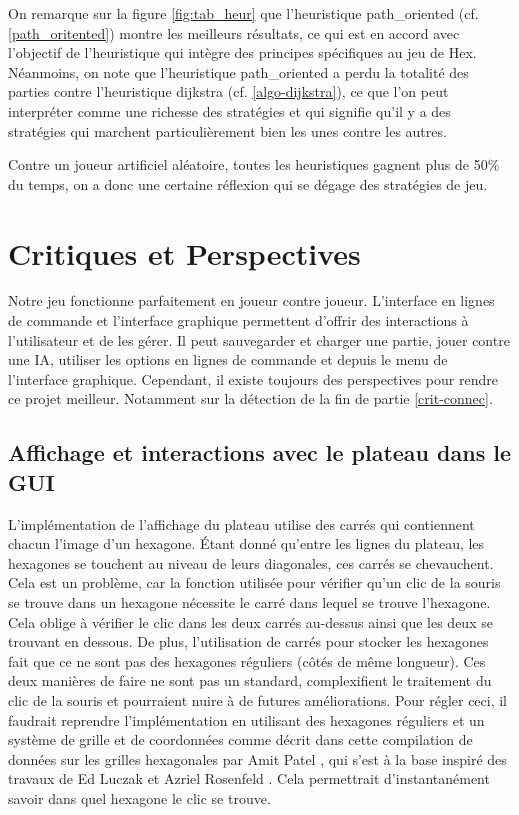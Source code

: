 \documentclass[12pt]{article}
\begin{document}
On remarque sur la figure \ref{fig:tab_heur} que l’heuristique path\_oriented (cf. \ref{path_oritented}) montre les meilleurs résultats, ce qui est en accord avec l’objectif de l’heuristique qui intègre des principes spécifiques au jeu de Hex. Néanmoins, on note que l’heuristique path\_oriented a perdu la totalité des parties contre l’heuristique dijkstra (cf. \ref{algo-dijkstra}), ce que l’on peut interpréter comme une richesse des stratégies et qui signifie qu’il y a des stratégies qui marchent particulièrement bien les unes contre les autres.

\bigskip
Contre un joueur artificiel aléatoire, toutes les heuristiques gagnent plus de 50\% du temps, on a donc une certaine réflexion qui se dégage des stratégies de jeu.

\newpage
\section{Critiques et Perspectives} \label{critiques}

Notre jeu fonctionne parfaitement en joueur contre joueur. L'interface en lignes de commande et l'interface graphique permettent d'offrir des interactions à l'utilisateur et de les gérer. Il peut sauvegarder et charger une partie, jouer contre une IA, utiliser les options en lignes de commande et depuis le menu de l'interface graphique. Cependant, il existe toujours des perspectives pour rendre ce projet meilleur. Notamment sur la détection de la fin de partie \ref{crit-connec}.

\subsection{Affichage et interactions avec le plateau dans le GUI} \label{crit-gui-board}

L’implémentation de l’affichage du plateau utilise des carrés qui contiennent chacun l’image d’un hexagone. Étant donné qu’entre les lignes du plateau, les hexagones se touchent au niveau de leurs diagonales, ces carrés se chevauchent. Cela est un problème, car la fonction utilisée pour vérifier qu’un clic de la souris se trouve dans un hexagone nécessite le carré dans lequel se trouve l’hexagone. Cela oblige à vérifier le clic dans les deux carrés au-dessus ainsi que les deux se trouvant en dessous. De plus, l’utilisation de carrés pour stocker les hexagones fait que ce ne sont pas des hexagones réguliers (côtés de même longueur). Ces deux manières de faire ne sont pas un standard, complexifient le traitement du clic de la souris et pourraient nuire à de futures améliorations. Pour régler ceci, il faudrait reprendre l’implémentation en utilisant des hexagones réguliers et un système de grille et de coordonnées comme décrit dans cette compilation de données sur les grilles hexagonales par Amit Patel \cite{AP}, qui s'est à la base inspiré des travaux de Ed Luczak et Azriel Rosenfeld \cite{LuczakRos76}. Cela permettrait d’instantanément savoir dans quel hexagone le clic se trouve.
\end{document}

